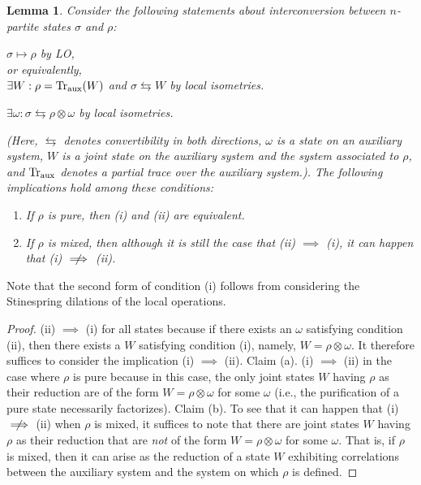 \documentclass[12pt]{article}
\theoremstyle{plain}
\newtheorem{lem}[theo]{Lemma}
\theoremstyle{definition}
\newcommand{\nimplies}{\centernot{\implies}}
\begin{document}
 \begin{samepage}
\begin{lem}
    \label{lem:conversion2}
    Consider the following statements about interconversion between $n$-partite states $\sigma$ and $\rho$:
    \begin{compactenum}[(i)]
        \item  $\sigma \mapsto \rho $ by LO,\\
         or equivalently,\\
          $\exists W : \rho = {\rm Tr}_{\rm aux}( W)$ and $\sigma \leftrightarrows
         W $ by local isometries.
        \item  
        $\exists \omega : \sigma \leftrightarrows
          \rho  \otimes \omega$ by local isometries. 
    \end{compactenum}
 (Here, $\leftrightarrows$ denotes convertibility in both directions, $\omega$ is a state on an auxiliary system, $W$ is a joint state on the auxiliary system and the system associated to $\rho$, and ${\rm Tr}_{\rm aux}$ denotes a partial trace over the auxiliary system.). The following implications hold among these conditions:
 \begin{enumerate}
 \item[(a)] If $\rho$ is pure, then (i) and (ii) are equivalent.
\item[(b)] If $\rho$ is mixed, then although it is still the case that (ii) $\implies$ (i), it can happen that (i) $\nimplies$ (ii).
 \end{enumerate} 
\end{lem}
\end{samepage}
 Note that the second form of condition (i) follows from considering the Stinespring dilations of the local operations.   
 
\begin{proof}
  (ii) $\implies$ (i) for all states because if there exists an $\omega$ satisfying condition (ii), then there exists a $W$ satisfying condition (i), namely, $W= \rho \otimes \omega$.  It therefore suffices to consider the implication (i) $\implies$ (ii).  Claim (a).  (i) $\implies$ (ii) in the case where $\rho$ is pure because in this case, the only joint states $W$ having $\rho$ as their reduction are of the form ${W=\rho \otimes \omega}$ for some $\omega$ (i.e., the purification of a pure state necessarily factorizes).  Claim (b).  To see that it can happen that (i) $\nimplies$ (ii) when $\rho$ is mixed, it suffices to note that there are joint states $W$ having $\rho$ as their reduction that are {\em not} of the form ${W=\rho \otimes \omega}$ for some $\omega$.  That is, if $\rho$ is mixed, then it can arise as the reduction of a state $W$ exhibiting correlations between the auxiliary system and the system on which $\rho$ is defined.
\end{proof}
\end{document}
